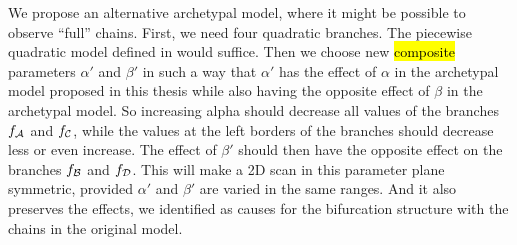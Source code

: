 We propose an alternative archetypal model, where it might be possible to observe ``full'' chains.
First, we need four quadratic branches.
The piecewise quadratic model defined in  would suffice.
Then we choose new \hl{composite} parameters $\alpha'$ and $\beta'$ in such a way that $\alpha'$ has the effect of $\alpha$ in the archetypal model proposed in this thesis while also having the opposite effect of $\beta$ in the archetypal model.
So increasing alpha should decrease all values of the branches $f_{\mathcal{A}}$ and $f_{\mathcal{C}}$, while the values at the left borders of the branches should decrease less or even increase.
The effect of $\beta'$ should then have the opposite effect on the branches $f_{\mathcal{B}}$ and $f_{\mathcal{D}}$.
This will make a 2D scan in this parameter plane symmetric, provided $\alpha'$ and $\beta'$ are varied in the same ranges.
And it also preserves the effects, we identified as causes for the bifurcation structure with the chains in the original model.

